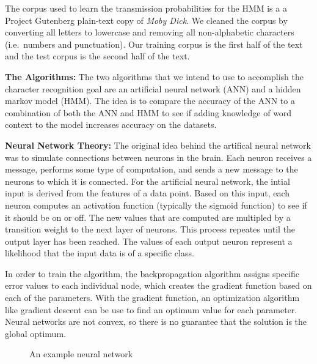 \documentclass[11pt,letterpaper]{article}
\begin{document}
The corpus used to learn the transmission probabilities for the HMM is a a Project Gutenberg
plain-text copy of \emph{Moby Dick}. We cleaned the corpus by converting all letters to lowercase
and removing all non-alphabetic characters (i.e.\ numbers and punctuation). Our training corpus is
the first half of the text and the test corpus is the second half of the text.

{\bf The Algorithms:} The two algorithms that we intend to use to accomplish the character recognition goal are an
artificial neural network (ANN) and a hidden markov model (HMM). The idea is to compare the accuracy
of the ANN to a combination of both the ANN and HMM to see if adding knowledge of word context to
the model increases accuracy on the datasets.

{\bf Neural Network Theory:} The original idea behind the artifical neural network was to simulate connections between neurons in
the brain. Each neuron receives a message, performs some type of computation, and sends a new
message to the neurons to which it is connected. For the artificial neural network, the intial input
is derived from the features of a data point. Based on this input, each neuron computes an
activation function (typically the sigmoid function) to see if it should be on or off. The new
values that are computed are multipled by a transition weight to the next layer of neurons. This
process repeates until the output layer has been reached. The values of each output neuron represent
a likelihood that the input data is of a specific class.

In order to train the algorithm, the backpropagation algorithm assigns specific error values to each
individual node, which creates the gradient function based on each of the parameters. With the
gradient function, an optimization algorithm like gradient descent can be use to find an optimum
value for each parameter. Neural networks are not convex, so there is no guarantee that the solution
is the global optimum.

\begin{figure}[h]
\centering
\caption{An example neural network}
\label{fig:exampleANN}
\end{figure}
\end{document}
